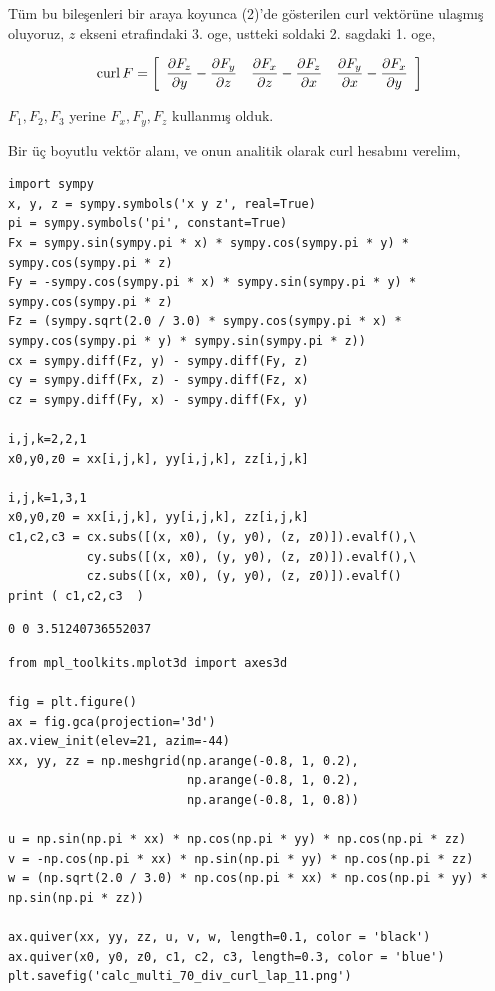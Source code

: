 \documentclass[12pt,fleqn]{article}\usepackage{../../common}
\begin{document}
Tüm bu bileşenleri bir araya koyunca (2)'de gösterilen curl vektörüne ulaşmış
oluyoruz, $z$ ekseni etrafindaki 3. oge, ustteki soldaki 2. sagdaki 1. oge,

$$
\operatorname{curl} F = \left[\begin{array}{ccc} 
\dfrac{\partial F_z}{\partial y} - \dfrac{\partial F_y}{\partial z} & 
\dfrac{\partial F_x}{\partial z} - \dfrac{\partial F_z}{\partial x} & 
\dfrac{\partial F_y}{\partial x} - \dfrac{\partial F_x}{\partial y} 
\end{array}\right]
$$

$F_1,F_2,F_3$ yerine $F_x,F_y,F_z$ kullanmış olduk.

Bir üç boyutlu vektör alanı, ve onun analitik olarak curl hesabını verelim,

\begin{verbatim}
import sympy
x, y, z = sympy.symbols('x y z', real=True)
pi = sympy.symbols('pi', constant=True)
Fx = sympy.sin(sympy.pi * x) * sympy.cos(sympy.pi * y) * sympy.cos(sympy.pi * z)
Fy = -sympy.cos(sympy.pi * x) * sympy.sin(sympy.pi * y) * sympy.cos(sympy.pi * z)
Fz = (sympy.sqrt(2.0 / 3.0) * sympy.cos(sympy.pi * x) * sympy.cos(sympy.pi * y) * sympy.sin(sympy.pi * z))
cx = sympy.diff(Fz, y) - sympy.diff(Fy, z) 
cy = sympy.diff(Fx, z) - sympy.diff(Fz, x)
cz = sympy.diff(Fy, x) - sympy.diff(Fx, y)

i,j,k=2,2,1
x0,y0,z0 = xx[i,j,k], yy[i,j,k], zz[i,j,k]

i,j,k=1,3,1
x0,y0,z0 = xx[i,j,k], yy[i,j,k], zz[i,j,k]
c1,c2,c3 = cx.subs([(x, x0), (y, y0), (z, z0)]).evalf(),\
           cy.subs([(x, x0), (y, y0), (z, z0)]).evalf(),\
           cz.subs([(x, x0), (y, y0), (z, z0)]).evalf()
print ( c1,c2,c3  )

\end{verbatim}

\begin{verbatim}
0 0 3.51240736552037
\end{verbatim}

\begin{verbatim}
from mpl_toolkits.mplot3d import axes3d

fig = plt.figure()
ax = fig.gca(projection='3d')
ax.view_init(elev=21, azim=-44)
xx, yy, zz = np.meshgrid(np.arange(-0.8, 1, 0.2),
                         np.arange(-0.8, 1, 0.2),
                         np.arange(-0.8, 1, 0.8))

u = np.sin(np.pi * xx) * np.cos(np.pi * yy) * np.cos(np.pi * zz)
v = -np.cos(np.pi * xx) * np.sin(np.pi * yy) * np.cos(np.pi * zz)
w = (np.sqrt(2.0 / 3.0) * np.cos(np.pi * xx) * np.cos(np.pi * yy) *  np.sin(np.pi * zz))

ax.quiver(xx, yy, zz, u, v, w, length=0.1, color = 'black')
ax.quiver(x0, y0, z0, c1, c2, c3, length=0.3, color = 'blue')
plt.savefig('calc_multi_70_div_curl_lap_11.png')
\end{verbatim}
\end{document}
